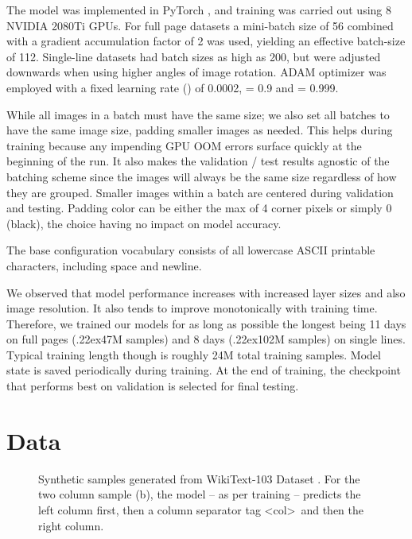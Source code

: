\documentclass[runningheads]{llncs}
\newcommand{\tilda}{\raise.22ex\hbox{}}
\begin{document}
The model was implemented in PyTorch \cite{NEURIPS2019_9015}, and training was carried out using 8 {\small NVIDIA} 2080Ti GPUs.
For full page datasets a mini-batch size of 56 combined with a gradient accumulation factor of 2 was used, yielding an effective batch-size of 112.
Single-line datasets had batch sizes as high as 200, but were adjusted downwards when using higher angles of image rotation.
{\small ADAM} optimizer \citep{kingma2017adam} was employed with a fixed learning rate () of 0.0002,  = 0.9 and  = 0.999.

While all images in a batch must have the same size; we also set all batches to have the same image size, padding smaller images as needed.
This helps during training because any impending {\small GPU OOM} errors surface quickly at the beginning of the run.
It also makes the validation / test results agnostic of the batching scheme since the images will always be the same size regardless of how they are grouped.
Smaller images within a batch are centered during validation and testing.
Padding color can be either the max of 4 corner pixels or simply 0 (black), the choice having no impact on model accuracy.


The base configuration vocabulary consists of all lowercase ASCII printable characters, including space and newline.


We observed that model performance increases with increased layer sizes and also image resolution.
It also tends to improve monotonically with training time.
Therefore, we trained our models for as long as possible the longest being 11 days on full pages (\tilda47M samples) and 8 days (\tilda102M samples) on single lines.
Typical training length though is roughly 24M total training samples.
Model state is saved periodically during training.
At the end of training, the checkpoint that performs best on validation is selected for final testing.

\section{Data}\label{sec-data}
\begin{figure}
     \centering
    \hfill
    \caption{\small Synthetic samples generated from WikiText-103 Dataset \citep{DBLP:journals/corr/MerityXBS16}. For the two column sample (b), the model -- as per training -- predicts the left column first, then a column separator tag \textless col\textgreater \, and then the right column.}
    \label{fig-synth}
\end{figure}
\end{document}
